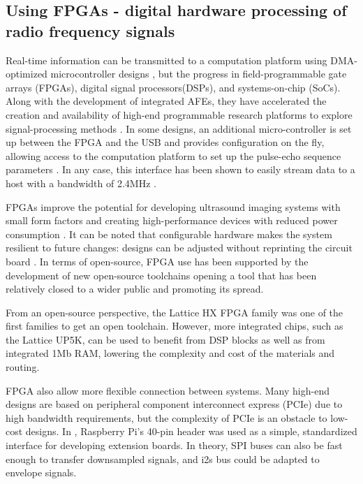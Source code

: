 \documentclass{article}
\begin{document}
\subsection{Using FPGAs - digital hardware processing of radio frequency signals}

Real-time information can be transmitted to a computation platform using DMA-optimized microcontroller designs \cite{kidav_architecture_2019}, but the progress in field-programmable gate arrays (FPGAs), digital signal processors(DSPs), and systems-on-chip (SoCs). Along with the development of integrated AFEs, they have accelerated the creation and availability of high-end programmable research platforms to explore signal-processing methods \cite{roman_open-source_2018}.  In some designs, an additional micro-controller is set up between the FPGA and the USB and provides configuration on the fly, allowing access to the computation platform to set up the pulse-echo sequence parameters \cite{raj_microcontroller_2017, raj_8051_2016}. In any case, this interface has been shown to easily stream data to a host with a bandwidth of 2.4MHz \cite{pashaei_live_2018, schneider_fully_2010}.

FPGAs improve the potential for developing ultrasound imaging systems with small form factors and creating high-performance devices with reduced power consumption \cite{dusa_low_2014}. It can be noted that configurable hardware makes the system resilient to future changes: designs can be adjusted without reprinting the circuit board \cite{zhang_fpga_2012, qiu_programmable_2010, ibrahim_single-fpga_2017}. In terms of open-source, FPGA use has been supported by the development of new open-source toolchains \cite{shah_yosys+nextpnr:_2019} opening a tool that has been relatively closed to a wider public \cite{saiz-vela_low-cost_2020} and promoting its spread.

From an open-source perspective, the Lattice HX FPGA family was one of the first families to get an open toolchain. However, more integrated chips, such as the Lattice UP5K, can be used to benefit from DSP blocks as well as from integrated 1Mb RAM, lowering the complexity and cost of the materials and routing. 

FPGA also allow more flexible connection between systems. Many high-end designs are based on peripheral component interconnect express (PCIe) due to high bandwidth requirements\cite{zimmermann_high_2018, lewandowski_low-cost_2012, kidav_architecture_2019}, but the complexity of PCIe is an obstacle to low-cost designs. In \cite{luc_jonveaux_un0rick_2019}, Raspberry Pi's 40-pin header was used as a simple, standardized interface for developing extension boards. In theory, SPI buses can also be fast enough to transfer downsampled signals, and i2s bus could be adapted to envelope signals.
\end{document}
